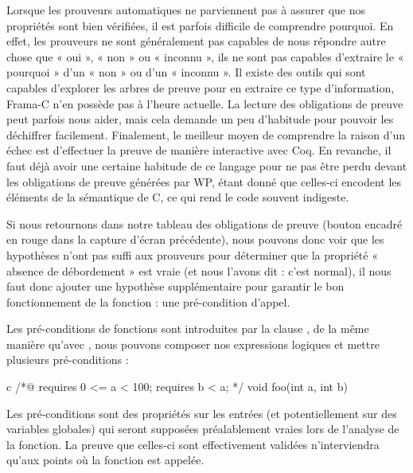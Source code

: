 Lorsque les prouveurs automatiques ne parviennent pas à assurer que nos 
propriétés sont bien vérifiées, il est parfois difficile de comprendre 
pourquoi. En effet, les prouveurs ne sont généralement pas capables de nous 
répondre autre chose que « oui », « non » ou « inconnu », ils ne sont pas capables
d'extraire le « pourquoi » d'un « non » ou d'un « inconnu ». Il existe des outils qui
sont capables d'explorer les arbres de preuve pour en extraire ce type 
d'information, Frama-C n'en possède pas à l'heure actuelle. La lecture des
obligations de preuve peut parfois nous aider, mais cela demande un peu 
d'habitude pour pouvoir les déchiffrer facilement. Finalement, le meilleur
moyen de comprendre la raison d'un échec est d'effectuer la preuve de manière
interactive avec Coq. En revanche, il faut déjà avoir une certaine habitude de
ce langage pour ne pas être perdu devant les obligations de preuve générées par
WP, étant donné que celles-ci encodent les éléments de la sémantique de C, ce 
qui rend le code souvent indigeste.



Si nous retournons dans notre tableau des obligations de preuve (bouton 
encadré en rouge dans la capture d'écran précédente), nous pouvons donc voir
que les hypothèses n'ont pas suffi aux prouveurs pour déterminer que la
propriété  « absence de débordement » est vraie (et nous l'avons dit : c'est
normal), il nous faut donc ajouter une hypothèse supplémentaire pour garantir
le bon fonctionnement de la fonction : une pré-condition d'appel.





Les pré-conditions de fonctions sont introduites par la clause ,
de la même manière qu'avec , nous pouvons composer nos 
expressions logiques et mettre plusieurs pré-conditions :



\begin{CodeBlock}{c}
/*@
  requires 0 <= a < 100;
  requires b < a;
*/
void foo(int a, int b){
  
}
\end{CodeBlock}



Les pré-conditions sont des propriétés sur les entrées (et potentiellement sur
des variables globales) qui seront supposées préalablement vraies lors de 
l'analyse de la fonction. La preuve que celles-ci sont effectivement validées 
n'interviendra qu'aux points où la fonction est appelée.



